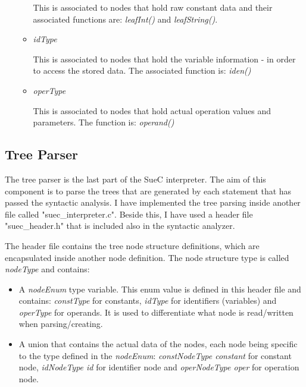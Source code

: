\documentclass[12pt,a4paper,twoside]{report}
\begin{document}
\begin{enumerate}
\begin{itemize}
		This is associated to nodes that hold raw constant data and their associated functions are: \textit{leafInt()} and \textit{leafString()}.
		
		\item \textit{idType}
		
		This is associated to nodes that hold the variable information - in order to access the stored data. The associated function is: \textit{iden()}
	
		\item \textit{operType}
		
		This is associated to nodes that hold actual operation values and parameters. The function is: \textit{operand()}
	\end{itemize}
\end{enumerate}
 
\subsection{Tree Parser}

The tree parser is the last part of the SueC interpreter. The aim of this component is to parse the trees that are generated by each statement that has passed the syntactic analysis. I have implemented the tree parsing inside another file called "suec\_interpreter.c". Beside this, I have used a header file "suec\_header.h" that is included also in the syntactic analyzer.

The header file contains the tree node structure definitions, which are encapsulated inside another node definition. The node structure type is called \textit{nodeType} and contains:
\begin{itemize}
	\item A \textit{nodeEnum} type variable. This enum value is defined in this header file and contains: \textit{constType} for constants, \textit{idType} for identifiers (variables) and \textit{operType} for operands. It is used to differentiate what node is read/written when parsing/creating. 
	\item A union that contains the actual data of the nodes, each node being specific to the type defined in the \textit{nodeEnum}: \textit{constNodeType constant} for constant node, \textit{idNodeType id} for identifier node and \textit{operNodeType oper} for operation node.  
\end{itemize}
\end{document}
